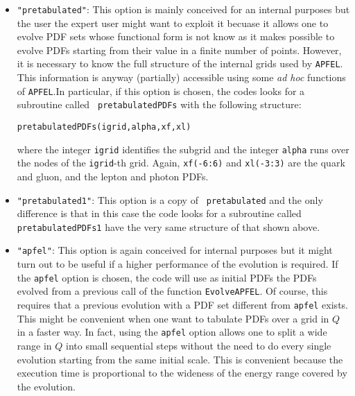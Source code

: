 \documentclass[11pt,a4paper]{article}
\begin{document}
\begin{itemize}
\begin{center}
{\tt xl(-3)} = $x\tau^+(x,Q_0)$,\\ 
{\tt xl(-2)} = $x\mu^+(x,Q_0)$,\\
{\tt xl(-1)} = $xe^+(x,Q_0)$,\\
{\tt xl(0)}  = $x\gamma(x,Q_0)$,\\
{\tt xl(1)}  = $xe^-(x,Q_0)$,\\
{\tt xl(2)}  = $x\mu^-(x,Q_0)$,\\
{\tt xl(3)}  = $x\tau^-(x,Q_0)$.
\end{center}
In addition, as compared to the options above, the index of the array
{\tt xf} now runs from {\tt -6} to {\tt 6} (and no longer to {\tt 7})
as the photon PDF is now the {\tt 0}-th entry of the array {\tt xl}.
\item {\tt "pretabulated"}: This option is mainly conceived for an
  internal purposes but the user the expert user might want to exploit
  it becuase it allows one to evolve PDF sets whose functional form is
  not know as it makes possible to evolve PDFs starting from their
  value in a finite number of points. However, it is necessary to know
  the full structure of the internal grids used by {\tt APFEL}. This
  information is anyway (partially) accessible using some \textit{ad
    hoc} functions of {\tt APFEL}.In particular, if this option is
  chosen, the codes looks for a subroutine called {\tt
    pretabulatedPDFs} with the following structure:
\begin{center}
\tt pretabulatedPDFs(igrid,alpha,xf,xl)
\end{center}
where the integer {\tt igrid} identifies the subgrid and the integer
{\tt alpha} runs over the nodes of the {\tt igrid}-th grid. Again,
{\tt xf(-6:6)} and {\tt xl(-3:3)} are the quark and gluon, and the
lepton and photon PDFs.
\item {\tt "pretabulated1"}: This option is a copy of {\tt
  pretabulated} and the only difference is that in this case the code
  looks for a subroutine called {\tt pretabulatedPDFs1} have the very
  same structure of that shown above.
\item {\tt "apfel"}: This option is again conceived for internal
  purposes but it might turn out to be useful if a higher performance
  of the evolution is required. If the {\tt apfel} option is chosen,
  the code will use as initial PDFs the PDFs evolved from a previous
  call of the function {\tt EvolveAPFEL}. Of course, this requires
  that a previous evolution with a PDF set different from {\tt apfel}
  exists. This might be convenient when one want to tabulate PDFs over
  a grid in $Q$ in a faster way. In fact, using the {\tt apfel} option
  allows one to split a wide range in $Q$ into small sequential steps
  without the need to do every single evolution starting from the same
  initial scale. This is convenient because the execution time is
  proportional to the wideness of the energy range covered by the
  evolution.
\end{itemize}
\end{document}
